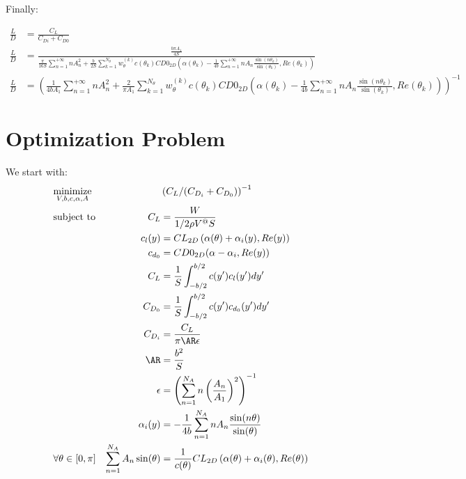 \documentclass[letterpaper,12pt]{article}
\begin{document}
Finally:

\begin{align}
	\label{eq:ld}
	\frac L D &= \frac {C_L} 
	{C_{Di} + C_{D0}} \nonumber \\
	\frac L D &= \frac{\frac{b \pi A_1}{4S}}{
		\frac {\pi}{16S} \sum_{n=1}^{+\infty} n A_{n}^2 + 
		\frac b {2S} \sum_{k=1}^{N_{\theta}} w_{\theta}^{(k)} c(\theta_k) CD0_{2D}\left( \alpha(\theta_k) - \frac {1}{4b} \sum_{n=1}^{+\infty} n A_n \frac{ \sin(n\theta_k) }{\sin(\theta_k)} , Re(\theta_k)\right)
	} \nonumber \\
	\frac L D &= \left(	\frac {1}{4bA_1} \sum_{n=1}^{+\infty} n A_{n}^2 + 
		\frac {2} {\pi A_1} \sum_{k=1}^{N_{\theta}} w_{\theta}^{(k)} c(\theta_k) CD0_{2D}\left( \alpha(\theta_k) - \frac {1}{4b} \sum_{n=1}^{+\infty} n A_n \frac{ \sin(n\theta_k) }{\sin(\theta_k)} , Re(\theta_k)\right) 
	\right)^{-1} 
\end{align}


\section{Optimization Problem}

We start with:
\begin{align*}
	& \underset{V, b, c, \alpha, A}{\text{minimize}}
	& & \left( C_L / (C_{D_i} + C_{D_0})\right)^{-1} \nonumber \\
	& \text{subject to} 
	& C_L &= \frac{W}{1/2 \rho V^@ S} \\
	& & c_l(y) &= CL_{2D} \left( \alpha(\theta) + \alpha_i(y), Re(y)\right) \\
	& & c_{d_0} &= CD0_{2D}(\alpha - \alpha_i, Re(y)) \\
	& & C_L &= \frac 1 S \int_{-b/2}^{b/2} c(y') c_l(y') dy'\\
	& & C_{D_0} &= \frac 1 S \int_{-b/2}^{b/2} c(y') c_{d_0}(y') dy'\\
	& & C_{D_i} & = \frac{C_L}{\pi \AR \epsilon} \\
	& & \AR &= \frac{b^2}{S} \\
	& & \epsilon &= \left(\sum_{n=1}^{N_A} n \left(\frac{A_n}{A_1}\right)^2 \right)^{-1} \\
	& & \alpha_i(y) &= -\frac 1 {4b} \sum_{n=1}^{N_A} n A_n\frac{\sin(n\theta)}{\sin(\theta)} \\
	& \forall \theta \in [0, \pi] & \sum_{n=1}^{N_A} A_n \sin(\theta) &= \frac{1}{c(\theta)} CL_{2D} \left( \alpha(\theta) + \alpha_i(\theta), Re(\theta)\right) \\
\end{align*}
\end{document}
